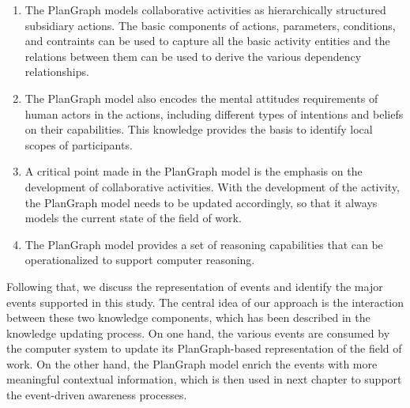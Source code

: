\begin{enumerate}
   \item The PlanGraph models collaborative activities as hierarchically structured subsidiary actions. The basic components of actions, parameters, conditions, and contraints can be used to capture all the basic activity entities and the relations between them can be used to derive the various dependency relationships. 
   \item The PlanGraph model also encodes the mental attitudes requirements of human actors in the actions, including different types of intentions and beliefs on their capabilities. This knowledge provides the basis to identify local scopes of participants. 
   \item A critical point made in the PlanGraph model is the emphasis on the development of collaborative activities. With the development of the activity, the PlanGraph model needs to be updated accordingly, so that it always models the current state of the field of work. 
   \item The PlanGraph model provides a set of reasoning capabilities that can be operationalized to support computer reasoning.  
\end{enumerate}

Following that, we discuss the representation of events and identify the major events supported in this study. The central idea of our approach is the interaction between these two knowledge components, which has been described in the knowledge updating process. On one hand, the various events are consumed by the computer system to update its PlanGraph-based representation of the field of work. On the other hand, the PlanGraph model enrich the events with more meaningful contextual information, which is then used in next chapter to support the event-driven awareness processes. 




 

